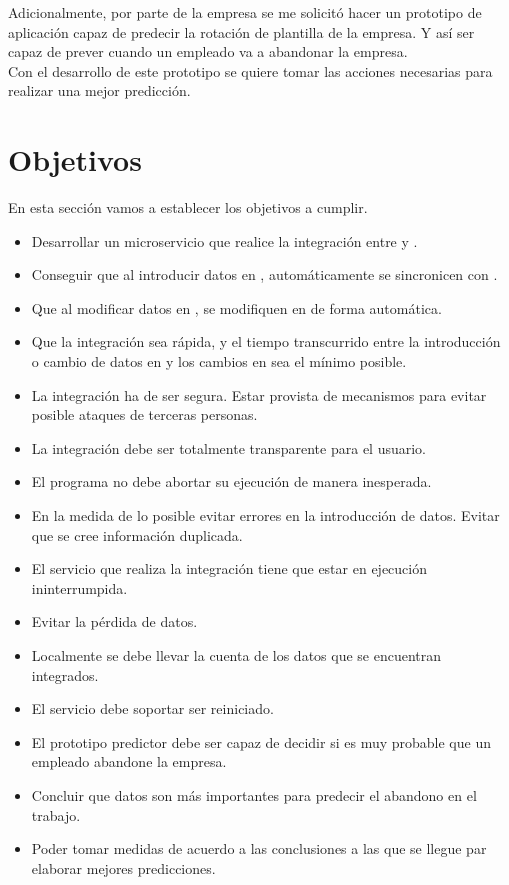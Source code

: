 Adicionalmente, por parte de la empresa se me solicitó hacer un prototipo de aplicación capaz de predecir la rotación de plantilla de la empresa.
Y así ser capaz de prever cuando un empleado va a abandonar la empresa. \\

Con el desarrollo de este prototipo se quiere tomar las acciones necesarias para realizar una mejor predicción.



\section{Objetivos}

En esta sección vamos a establecer los objetivos a cumplir.

\begin{itemize}
	\item Desarrollar un microservicio que realice la integración entre \hs{} y \wday{}.
	\item Conseguir que al introducir datos en \hs{}, automáticamente se sincronicen con \wday{}.
	\item Que al modificar datos en \hs{}, se modifiquen en \wday{} de forma automática.
	\item Que la integración sea rápida, y el tiempo transcurrido entre la introducción o cambio de datos en \hs{} y los cambios en \wday{} sea el mínimo posible.
	\item La integración ha de ser segura. Estar provista de mecanismos para evitar posible ataques de terceras personas.
	\item La integración debe ser totalmente transparente para el usuario. 
	\item El programa no debe abortar su ejecución de manera inesperada.
	\item En la medida de lo posible evitar errores en la introducción de datos. Evitar que se cree información duplicada.
	\item El servicio que realiza la integración tiene que estar en ejecución ininterrumpida.
	\item Evitar la pérdida de datos.
	\item Localmente se debe llevar la cuenta de los datos que se encuentran integrados.
	\item El servicio debe soportar ser reiniciado.
	\item El prototipo predictor debe ser capaz de decidir si es muy probable que un empleado abandone la empresa.
	\item Concluir que datos son más importantes para predecir el abandono en el trabajo.
	\item Poder tomar medidas de acuerdo a las conclusiones a las que se llegue par elaborar mejores predicciones.
\end{itemize}


